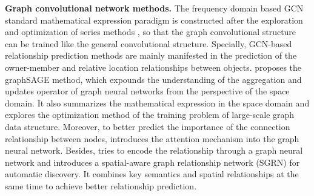 \documentclass{article}
\begin{document}
\textbf{Graph convolutional network methods.}
The frequency domain based GCN standard mathematical expression paradigm is constructed after the exploration and optimization of series methods \cite{article6, article7, article8, article9}, so that the graph convolutional structure can be trained like the general convolutional structure. Specially, GCN-based relationship prediction methods are mainly manifested in the prediction of the owner-member and relative location relationships between objects. \cite{article10} proposes the graphSAGE method, which expounds the understanding of the aggregation and updates operator of graph neural networks from the perspective of the space domain. It also summarizes the mathematical expression in the space domain and explores the optimization method of the training problem of large-scale graph data structure. Moreover, to better predict the importance of the connection relationship between nodes, \cite{article11} introduces the attention mechanism into the graph neural network. Besides, \cite{article12} tries to encode the relationship through a graph neural network and introduces a spatial-aware graph relationship network (SGRN) for automatic discovery. It combines key semantics and spatial relationships at the same time to achieve better relationship prediction.
\end{document}
